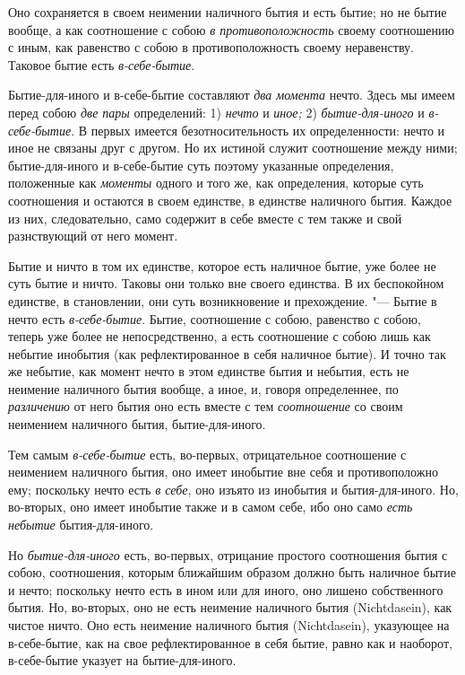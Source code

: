 Оно сохраняется в своем неимении наличного бытия и есть бытие; но не бытие
вообще, а как соотношение с собою {\em в
противоположность} своему соотношению с иным, как равенство с собою в
противоположность своему неравенству. Таковое бытие есть
{\em в-себе-бытие}.

Бытие-для-иного и в-себе-бытие составляют {\em два
момента} нечто. Здесь мы имеем перед собою {\em две
пары} определений: 1) {\em нечто} и
{\em иное;} 2) {\em бытие-для-иного} и {\em в-себе-бытие}. В первых имеется
безотносительность их определенности: нечто и иное не связаны друг с
другом. Но их истиной служит соотношение между ними; бытие-для-иного и
в-себе-бытие суть поэтому указанные определения, положенные как
{\em моменты} одного и того же, как определения,
которые суть соотношения и остаются в своем единстве, в единстве наличного
бытия. Каждое из них, следовательно, само содержит в себе вместе с тем
также и свой разнствующий от него момент.

Бытие и ничто в том их единстве, которое есть наличное бытие, уже более не
суть бытие и ничто. Таковы они только вне своего единства. В их беспокойном
единстве, в становлении, они суть возникновение и прехождение. "--- Бытие в
нечто есть {\em в-себе-бытие}. Бытие, соотношение с
собою, равенство с собою, теперь уже более не непосредственно, а есть
соотношение с собою лишь как небытие инобытия (как рефлектированное в себя
наличное бытие). И точно так же небытие, как момент нечто в этом единстве
бытия и небытия, есть не неимение наличного бытия вообще, а иное, и,
говоря определеннее, по {\em различению} от него бытия
оно есть вместе с тем {\em соотношение} со своим
неимением наличного бытия, бытие-для-иного.

Тем самым {\em в-себе-бытие} есть, во-первых,
отрицательное соотношение с неимением наличного бытия, оно имеет инобытие
вне себя и противоположно ему; поскольку нечто есть
{\em в себе}, оно изъято из инобытия и бытия-для-иного.
Но, во-вторых, оно имеет инобытие также и в самом себе, ибо оно
само {\em есть небытие} бытия-для-иного.

Но {\em бытие-для-иного} есть, во-первых, отрицание
простого соотношения бытия с собою, соотношения, которым ближайшим образом
должно быть наличное бытие и нечто; поскольку нечто есть в ином
или для иного, оно лишено собственного бытия. Но, во-вторых,
оно не есть неимение наличного бытия (Nicht\-dasein), как чистое ничто. Оно
есть неимение наличного бытия (Nicht\-dasein), указующее на в-себе-бытие, как
на свое рефлектированное в себя бытие, равно как и наоборот, в-себе-бытие
указует на бытие-для-иного.

